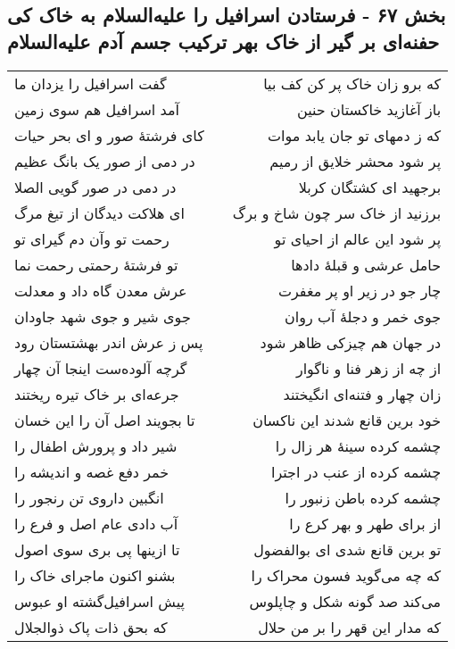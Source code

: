 \begin{center}
\section*{بخش ۶۷ - فرستادن اسرافیل را علیه‌السلام به خاک کی حفنه‌ای بر گیر از  خاک بهر ترکیب جسم آدم علیه‌السلام}
\label{sec:sh067}
\begin{longtable}{l p{0.5cm} r}
گفت اسرافیل را یزدان ما
&&
که برو زان خاک پر کن کف بیا
\\
آمد اسرافیل هم سوی زمین
&&
باز آغازید خاکستان حنین
\\
کای فرشتهٔ صور و ای بحر حیات
&&
که ز دمهای تو جان یابد موات
\\
در دمی از صور یک بانگ عظیم
&&
پر شود محشر خلایق از رمیم
\\
در دمی در صور گویی الصلا
&&
برجهید ای کشتگان کربلا
\\
ای هلاکت دیدگان از تیغ مرگ
&&
برزنید از خاک سر چون شاخ و برگ
\\
رحمت تو وآن دم گیرای تو
&&
پر شود این عالم از احیای تو
\\
تو فرشتهٔ رحمتی رحمت نما
&&
حامل عرشی و قبلهٔ دادها
\\
عرش معدن گاه داد و معدلت
&&
چار جو در زیر او پر مغفرت
\\
جوی شیر و جوی شهد جاودان
&&
جوی خمر و دجلهٔ آب روان
\\
پس ز عرش اندر بهشتستان رود
&&
در جهان هم چیزکی ظاهر شود
\\
گرچه آلوده‌ست اینجا آن چهار
&&
از چه از زهر فنا و ناگوار
\\
جرعه‌ای بر خاک تیره ریختند
&&
زان چهار و فتنه‌ای انگیختند
\\
تا بجویند اصل آن را این خسان
&&
خود برین قانع شدند این ناکسان
\\
شیر داد و پرورش اطفال را
&&
چشمه کرده سینهٔ هر زال را
\\
خمر دفع غصه و اندیشه را
&&
چشمه کرده از عنب در اجترا
\\
انگبین داروی تن رنجور را
&&
چشمه کرده باطن زنبور را
\\
آب دادی عام اصل و فرع را
&&
از برای طهر و بهر کرع را
\\
تا ازینها پی بری سوی اصول
&&
تو برین قانع شدی ای بوالفضول
\\
بشنو اکنون ماجرای خاک را
&&
که چه می‌گوید فسون محراک را
\\
پیش اسرافیل‌گشته او عبوس
&&
می‌کند صد گونه شکل و چاپلوس
\\
که بحق ذات پاک ذوالجلال
&&
که مدار این قهر را بر من حلال
\\

\end{longtable}
\end{center}

